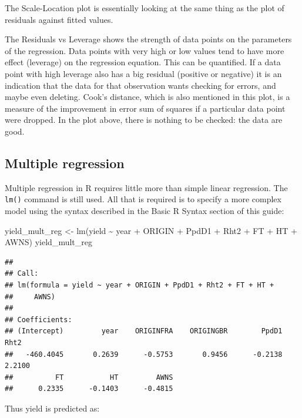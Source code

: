 \documentclass[
]{book}
\newenvironment{Shaded}{\begin{snugshade}}{\end{snugshade}}
\newcommand{\FunctionTok}[1]{\textcolor[rgb]{0.00,0.00,0.00}{#1}}
\newcommand{\NormalTok}[1]{#1}
\newcommand{\OtherTok}[1]{\textcolor[rgb]{0.56,0.35,0.01}{#1}}
\newcommand{\SpecialCharTok}[1]{\textcolor[rgb]{0.00,0.00,0.00}{#1}}
\begin{document}
The Scale-Location plot is essentially looking at the same thing as the plot of residuals against fitted values.

The Residuals vs Leverage shows the strength of data points on the parameters of the regression. Data points with very high or low values tend to have more effect (leverage) on the regression equation. This can be quantified. If a data point with high leverage also has a big residual (positive or negative) it is an indication that the data for that observation wants checking for errors, and maybe even deleting. Cook's distance, which is also mentioned in this plot, is a measure of the improvement in error sum of squares if a particular data point were dropped. In the plot above, there is nothing to be checked: the data are good.

\hypertarget{multiple-regression}{%
\subsection{Multiple regression}\label{multiple-regression}}

Multiple regression in R requires little more than simple linear regression. The \texttt{lm()} command is still used. All that is required is to specify a more complex model using the syntax described in the Basic R Syntax section of this guide:

\begin{Shaded}
\begin{Highlighting}[]
\NormalTok{yield\_mult\_reg }\OtherTok{\textless{}{-}} \FunctionTok{lm}\NormalTok{(yield }\SpecialCharTok{\textasciitilde{}}\NormalTok{ year }\SpecialCharTok{+}\NormalTok{ ORIGIN }\SpecialCharTok{+}\NormalTok{ PpdD1 }\SpecialCharTok{+}\NormalTok{ Rht2 }\SpecialCharTok{+}\NormalTok{ FT }\SpecialCharTok{+} 
\NormalTok{    HT }\SpecialCharTok{+}\NormalTok{ AWNS)}
\NormalTok{yield\_mult\_reg}
\end{Highlighting}
\end{Shaded}

\begin{verbatim}
## 
## Call:
## lm(formula = yield ~ year + ORIGIN + PpdD1 + Rht2 + FT + HT + 
##     AWNS)
## 
## Coefficients:
## (Intercept)         year    ORIGINFRA    ORIGINGBR        PpdD1         Rht2  
##   -460.4045       0.2639      -0.5753       0.9456      -0.2138       2.2100  
##          FT           HT         AWNS  
##      0.2335      -0.1403      -0.4815
\end{verbatim}

Thus yield is predicted as:
\end{document}
